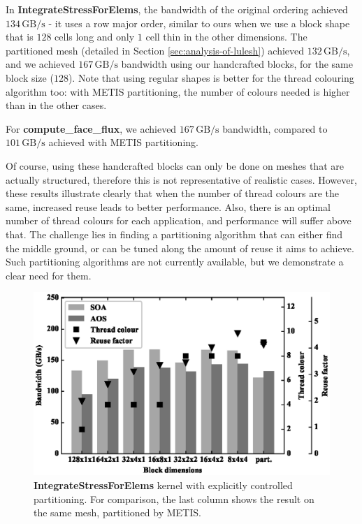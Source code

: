 In \textbf{IntegrateStressForElems}, the bandwidth of the original ordering achieved  $134\,\text{GB/s}$ - it uses a row major order, similar to ours
when we use a block shape that is $128$ cells long and only $1$ cell thin in the
other dimensions. The partitioned mesh (detailed
in Section \ref{sec:analysis-of-lulesh}) achieved $132\,\text{GB/s}$, and we achieved $167\,\text{GB/s}$
bandwidth using our handcrafted blocks, for the same block size ($128$). Note
that using regular shapes is better for the thread colouring algorithm too: with
METIS partitioning, the number of colours needed is higher than in the other
cases.

For \textbf{compute\_face\_flux}, we achieved $167\,\text{GB/s}$ bandwidth,
compared to $101\,\text{GB/s}$ achieved with METIS partitioning.

Of course, using these handcrafted blocks can only be done on meshes that are actually structured, therefore this is not representative of realistic cases. However, these results illustrate clearly that when
the number of thread colours are the same, increased reuse leads to better
performance. Also, there is an optimal number of thread colours for each
application, and performance will suffer above that. The challenge lies in
finding a partitioning algorithm that can either find the middle ground, or can
be tuned along the amount of reuse it aims to achieve. Such partitioning algorithms are not currently available, but we demonstrate a clear need for them.

\begin{figure}[Htbp]
  \centering
  \includegraphics[width=12cm]{fig/lulesh_block.eps}
  \caption{\textbf{IntegrateStressForElems} kernel with explicitly controlled
  partitioning. For comparison, the last column shows the result on the same
  mesh, partitioned by METIS.}
  \label{fig:lulesh_block}
\end{figure}

